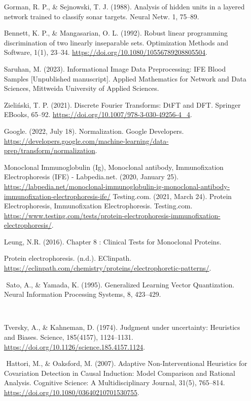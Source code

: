 \documentclass[12pt,twoside]{report}
\begin{document}
\begin{thebibliography}{26}
Gorman, R. P., \& Sejnowski, T. J. (1988). Analysis of hidden units in a layered network trained to classify sonar targets. Neural Netw. 1,
75–89.

Bennett, K. P., \& Mangasarian, O. L. (1992). Robust linear programming discrimination of two linearly inseparable sets. Optimization Methods and Software, 1(1), 23–34. \url{https://doi.org/10.1080/10556789208805504}.


Saruhan, M. (2023). Informational Image Data Preprocessing: IFE Blood Samples [Unpublished manuscript]. Applied Mathematics for Network and Data Sciences, Mittweida University of Applied Sciences.

Zieliński, T. P. (2021). Discrete Fourier Transforms: DtFT and DFT. Springer EBooks, 65–92. \url{https://doi.org/10.1007/978-3-030-49256-4_4}.


Google. (2022, July 18). Normalization. Google Developers. \url{https://developers.google.com/machine-learning/data-prep/transform/normalization}.

Monoclonal Immunoglobulin (Ig), Monoclonal antibody, Immunofixation Electrophoresis (IFE) - Labpedia.net. (2020, January 25). \url{https://labpedia.net/monoclonal-immunoglobulin-ig-monoclonal-antibody-immunofixation-electrophoresis-ife/}
‌
Testing.com. (2021, March 24). Protein Electrophoresis, Immunofixation Electrophoresis. Testing.com. \url{https://www.testing.com/tests/protein-electrophoresis-immunofixation-electrophoresis/}.
‌

Leung, N.R. (2016). Chapter 8 : Clinical Tests for Monoclonal Proteins.

Protein electrophoresis. (n.d.). EClinpath. \url{https://eclinpath.com/chemistry/proteins/electrophoretic-patterns/}.

‌
Sato, A., \& Yamada, K. (1995). Generalized Learning Vector Quantization. Neural Information Processing Systems, 8, 423–429.

‌

Tversky, A., \& Kahneman, D. (1974). Judgment under uncertainty: Heuristics and Biases. Science, 185(4157), 1124–1131. \url{https://doi.org/10.1126/science.185.4157.1124}.

‌
Hattori, M., \& Oaksford, M. (2007). Adaptive Non-Interventional Heuristics for Covariation Detection in Causal Induction: Model Comparison and Rational Analysis. Cognitive Science: A Multidisciplinary Journal, 31(5), 765–814. \url{https://doi.org/10.1080/03640210701530755}.


\end{thebibliography}
\end{document}
